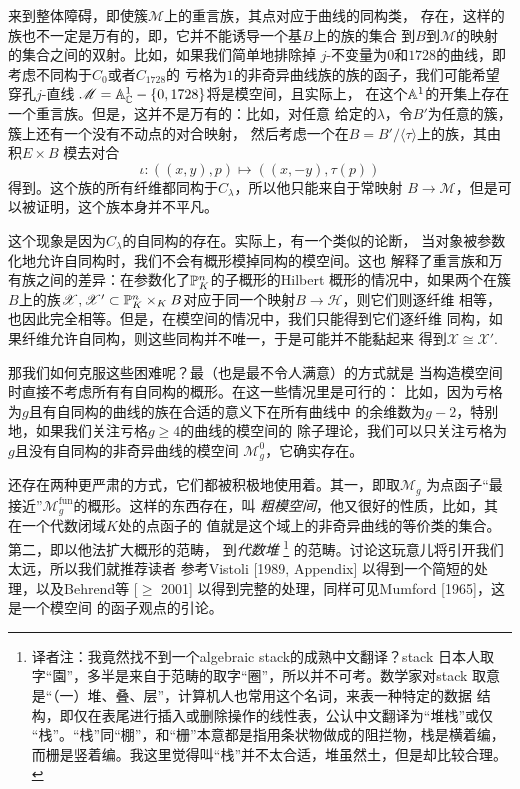 
来到整体障碍，即使簇$\mathscr M$上的重言族，其点对应于曲线的同构类，
存在，这样的族也不一定是万有的，即，它并不能诱导一个基$B$上的族的集合
到$B$到$\mathscr M$的映射的集合之间的双射。比如，如果我们简单地排除掉
$j$-不变量为$0$和$1728$的曲线，即考虑不同构于$C_0$或者$C_{1728}$的
亏格为$1$的非奇异曲线族的族的函子，我们可能希望穿孔$j$-直线
$\mathscr M=\A_{\mathbb C}^1-\{0,1728\}$将是模空间，且实际上，
在这个$\A^1$的开集上存在一个重言族。但是，这并不是万有的：比如，对任意
给定的$\lambda$，令$B'$为任意的簇，簇上还有一个没有不动点的对合映射，
然后考虑一个在$B=B'/\langle \tau\rangle$上的族，其由积$E\times B$
模去对合
\[
    \iota:((x,y),p)\mapsto ((x,-y),\tau(p))
\]
得到。这个族的所有纤维都同构于$C_\lambda$，所以他只能来自于常映射
$B\to \mathscr M$，但是可以被证明，这个族本身并不平凡。

这个现象是因为$C_\lambda$的自同构的存在。实际上，有一个类似的论断，
当对象被参数化地允许自同构时，我们不会有概形模掉同构的模空间。这也
解释了重言族和万有族之间的差异：在参数化了$\P_K^n$的子概形的Hilbert
概形的情况中，如果两个在簇$B$上的族$\mathscr X,\mathscr X'\subset 
\P_K^n\times_K B$对应于同一个映射$B\to \mathscr H$，则它们则逐纤维
相等，也因此完全相等。但是，在模空间的情况中，我们只能得到它们逐纤维
同构，如果纤维允许自同构，则这些同构并不唯一，于是可能并不能黏起来
得到$\mathscr X\cong \mathscr X'$.

那我们如何克服这些困难呢？最\naive（也是最不令人满意）的方式就是
当构造模空间时直接不考虑所有有自同构的概形。在这一些情况里是可行的：
比如，因为亏格为$g$且有自同构的曲线的族在合适的意义下在所有曲线中
的余维数为$g-2$，特别地，如果我们关注亏格$g\geq 4$的曲线的模空间的
除子理论，我们可以只关注亏格为$g$且没有自同构的非奇异曲线的模空间
$\mathscr M_g^0$，它确实存在。

还存在两种更严肃的方式，它们都被积极地使用着。其一，即取$\mathscr M_g$
为点函子“最接近”$\mathscr M_g^{\text{fun}}$的概形。这样的东西存在，叫
\emph{粗模空间}，他又很好的性质，比如，其在一个代数闭域$K$处的点函子的
值就是这个域上的非奇异曲线的等价类的集合。第二，即以他法扩大概形的范畴，
到\emph{代数堆}%
\footnote{译者注：我竟然找不到一个algebraic stack的成熟中文翻译？stack
日本人取字“園”，多半是来自于范畴的取字“圈”，所以并不可考。数学家对stack
取意是“（一）堆、叠、层”，计算机人也常用这个名词，来表一种特定的数据
结构，即仅在表尾进行插入或删除操作的线性表，公认中文翻译为“堆栈”或仅
“栈”。“栈”同“棚”，和“栅”本意都是指用条状物做成的阻拦物，栈是横着编，
而栅是竖着编。我这里觉得叫“栈”并不太合适，堆虽然土，但是却比较合理。
}%
的范畴。讨论这玩意儿将引开我们太远，所以我们就推荐读者%
参考Vistoli [1989, Appendix] 以得到一个简短的处理，以及Behrend等
[$\geq$ 2001] 以得到完整的处理，同样可见Mumford [1965]，这是一个模空间
的函子观点的引论。